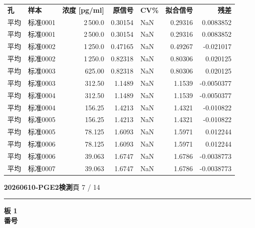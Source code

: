 \documentclass[UTF8,10pt,a4paper,fontset=fandol]{ctexart}
\begin{document}
\small
\begin{tabular}{@{}l l r r l r r@{}}
\textbf{孔} & \textbf{样本} & \textbf{浓度 [pg/ml]} &
\textbf{原信号} & \textbf{CV\%} & \textbf{拟合信号} & \textbf{残差}\\
平均 & 标准0001 & 2\,500.0 & 0.30154 & NaN & 0.29316 & 0.0083852\\
平均 & 标准0001 & 2\,500.0 & 0.30154 & NaN & 0.29316 & 0.0083852\\
平均 & 标准0002 & 1\,250.0 & 0.47165 & NaN & 0.49267 & -0.021017\\
平均 & 标准0002 & 1\,250.0 & 0.82318 & NaN & 0.80306 & 0.020125\\
平均 & 标准0003 & 625.00 & 0.82318 & NaN & 0.80306 & 0.020125\\
平均 & 标准0003 & 312.50 & 1.1489 & NaN & 1.1539 & -0.0050377\\
平均 & 标准0004 & 312.50 & 1.1489 & NaN & 1.1539 & -0.0050377\\
平均 & 标准0004 & 156.25 & 1.4213 & NaN & 1.4321 & -0.010822\\
平均 & 标准0005 & 156.25 & 1.4213 & NaN & 1.4321 & -0.010822\\
平均 & 标准0005 & 78.125 & 1.6093 & NaN & 1.5971 & 0.012244\\
平均 & 标准0006 & 78.125 & 1.6093 & NaN & 1.5971 & 0.012244\\
平均 & 标准0006 & 39.063 & 1.6747 & NaN & 1.6786 & -0.0038773\\
平均 & 标准0007 & 39.063 & 1.6747 & NaN & 1.6786 & -0.0038773\\
\end{tabular}

\normalsize


\newpage

\noindent
\textbf{20260610-PGE2検測}\hfill\scriptsize 頁 7 / 14

\vspace{2pt}
\noindent\rule{\linewidth}{0.4pt}

\medskip
\noindent\textbf{板 1}\\[-2pt]
\noindent\textbf{番号}
\end{document}
